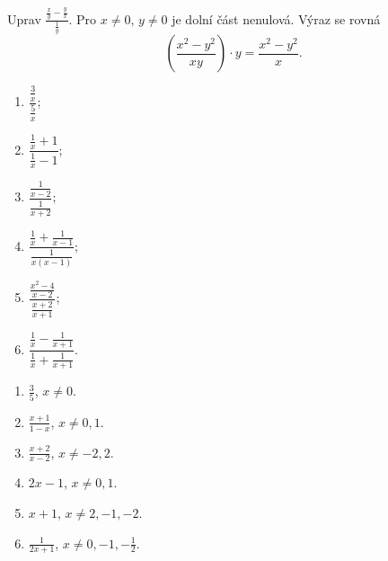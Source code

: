 \documentclass[11pt,a4paper]{article}
\begin{document}
\begin{zadaniReseniBox}[breakable=false,title={Rozšíření 1}]
Uprav $\displaystyle\frac{\frac xy-\frac yx}{\frac1y}$.
\tcblower
Pro $x\ne0$, $y\ne0$ je dolní část nenulová. Výraz se rovná
\[\left(\frac{x^2-y^2}{xy}\right)\cdot y=\frac{x^2-y^2}{x}.\]
\end{zadaniReseniBox}
\begin{zadaniReseniBox}[breakable=false,title={Domácí úkol}]
\begin{enumerate}[label=\alph*)]
\item $\dfrac{\frac3x}{\frac5x}$;
\item $\dfrac{\frac1x+1}{\frac1x-1}$;
\item $\dfrac{\frac1{x-2}}{\frac1{x+2}}$;
\item $\dfrac{\frac1x+\frac1{x-1}}{\frac1{x(x-1)}}$;
\item $\dfrac{\frac{x^2-4}{x-2}}{\frac{x+2}{x+1}}$;
\item $\dfrac{\frac1x-\frac1{x+1}}{\frac1x+\frac1{x+1}}$.
\end{enumerate}
\tcblower
\begin{enumerate}[label=\alph*)]
\item $\frac35$, $x\ne0$.
\item $\frac{x+1}{1-x}$, $x\ne0,1$.
\item $\frac{x+2}{x-2}$, $x\ne-2,2$.
\item $2x-1$, $x\ne0,1$.
\item $x+1$, $x\ne2,-1,-2$.
\item $\frac1{2x+1}$, $x\ne0,-1,-\frac12$.
\end{enumerate}
\end{zadaniReseniBox}
\end{document}
